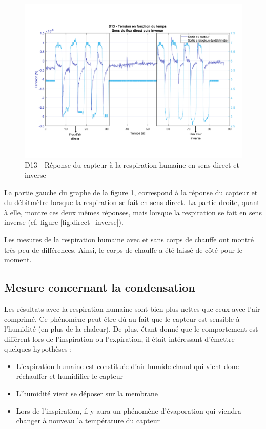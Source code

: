 \begin{figure}[H]
    \centering
    \includegraphics[scale = 0.6]{assets/figures/D13_human_breath_direct_invert_blue.pdf}
    \caption{D13 - Réponse du capteur à la respiration humaine en sens direct et inverse}
    \label{fig:D13_human_breath_direct_invert}
\end{figure}

La partie gauche du graphe de la figure \ref{fig:D13_human_breath_direct_invert}, correspond à la réponse du capteur et du débitmètre lorsque la 
respiration se fait en sens direct. La partie droite, quant à elle, montre ces deux mêmes réponses, mais lorsque la respiration se fait en sens 
inverse (cf. figure \ref{fig:direct_inverse}). 

Les mesures de la respiration humaine avec et sans corps de chauffe ont montré très peu de différences. Ainsi, le corps de chauffe a été laissé 
de côté pour le moment. 

\subsection{Mesure concernant la condensation}
Les résultats avec la respiration humaine sont bien plus nettes que ceux avec l'air comprimé. Ce phénomène peut être dû au fait que le capteur 
est sensible à l'humidité (en plus de la chaleur). De plus, étant donné que le comportement est différent lors de l'inspiration ou l'expiration, 
il était intéressant d'émettre quelques hypothèses :
\begin{itemize}
    \item L'expiration humaine est constituée d'air humide chaud qui vient donc réchauffer et humidifier le capteur
    \item L'humidité vient se déposer sur la membrane
    \item Lors de l'inspiration, il y aura un phénomène d'évaporation qui viendra changer à nouveau la température du capteur
\end{itemize}

